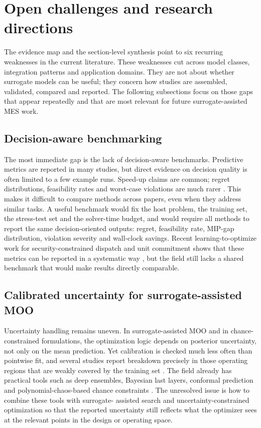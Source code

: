\documentclass[final,5p,times,twocolumn]{elsarticle}
\begin{document}
\section{Open challenges and research directions}
\label{sec:challenges}
The evidence map and the section-level synthesis point to six recurring
weaknesses in the current literature. These weaknesses cut across model
classes, integration patterns and application domains. They are not
about whether surrogate models can be useful; they concern how studies
are assembled, validated, compared and reported. The following
subsections focus on those gaps that appear repeatedly and that are most
relevant for future surrogate-assisted MES work.
\subsection{Decision-aware benchmarking}
\label{sec:ch:bench}
The most immediate gap is the lack of decision-aware benchmarks.
Predictive metrics are reported in many studies, but direct evidence on
decision quality is often limited to a few example runs. Speed-up claims
are common; regret distributions, feasibility rates and worst-case
violations are much rarer
\cite{Mylonopoulos202332697,Ruan2021221,Khaloie2025,Lim2025,Perera2019191}.
This makes it difficult to compare methods across papers, even when they
address similar tasks. A useful benchmark would fix the host problem,
the training set, the stress-test set and the solver-time budget, and
would require all methods to report the same decision-oriented outputs:
regret, feasibility rate, MIP-gap distribution, violation severity and
wall-clock savings. Recent learning-to-optimize work for
security-constrained dispatch and unit commitment shows that these
metrics can be reported in a systematic way
\cite{Wu2022231,Chen20244723,Chen2022,Wu2024391,Liang20246508}, but
the field still lacks a shared benchmark that would make results
directly comparable.
\subsection{Calibrated uncertainty for surrogate-assisted MOO}
\label{sec:ch:uq}
Uncertainty handling remains uneven. In surrogate-assisted MOO and in
chance-constrained formulations, the optimization logic depends on
posterior uncertainty, not only on the mean prediction. Yet calibration
is checked much less often than pointwise fit, and several studies
report breakdown precisely in those operating regions that are weakly
covered by the training set
\cite{Hu2020,Hu2021671,Volodina2022,Lawson201647,Hu2024,Buchanan2024,Subedi2026157}.
The field already has practical tools such as deep ensembles, Bayesian
last layers, conformal prediction and polynomial-chaos-based chance
constraints
\cite{Chen2023657,Liang20246508,Muhlpfordt20194806,Koirala20242284,Xu20212696}.
The unresolved issue is how to combine these tools with surrogate-
assisted search and uncertainty-constrained optimization so that the
reported uncertainty still reflects what the optimizer sees at the
relevant points in the design or operating space.
\end{document}
